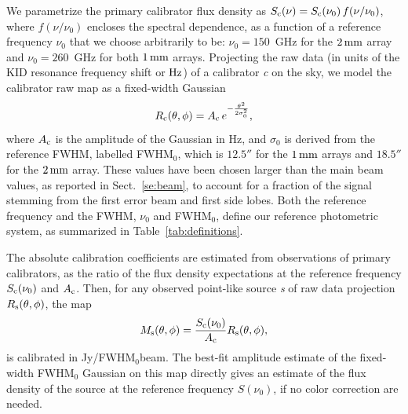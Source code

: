 We parametrize the primary calibrator flux density as 
$S_{\rm{c}}(\nu) = S_{\rm{c}}(\nu_0)\, f(\nu/\nu_{0})$, where $f(\nu/\nu_{0})$
encloses the spectral dependence, 
as a function of a reference frequency $\nu_{0}$ that we choose
arbitrarily to be: $\nu_{0} = 150$~GHz for the $2\,\rm{mm}$ array and
$\nu_{0}= 260$~GHz for both $1\,\rm{mm}$ arrays. Projecting the raw
data (in units of the KID resonance frequency shift or $\rm Hz$) of a
calibrator {\sl c} on the sky, we model the calibrator raw map as a
fixed-width Gaussian
\begin{equation}
  R_{\rm{c}}(\theta, \phi)  = A_{\rm{c}} \, e^{-\frac{\theta^{2}}{2\sigma_{0}^{2}}},
  \label{eq:gaussian_amplitude}
\end{equation}
{\lp where $A_{\rm{c}}$ is the amplitude of the 
Gaussian in Hz,} and $\sigma_{0}$ is derived from the
reference FWHM, labelled FWHM$_{0}$, which is $12.5''$ for the $1\, \rm{mm}$
arrays and $18.5''$ for the $2\,\rm{mm}$ array. These values have
been chosen larger than the main beam values, as reported in
Sect.~\ref{se:beam}, to account for a fraction of the signal stemming from
the first error beam and first side lobes.
Both the reference frequency and the FWHM, $\nu_0$ and FWHM$_{0}$, define
our reference photometric system, as summarized in Table~\ref{tab:definitions}.

The absolute calibration coefficients are estimated from observations
of primary calibrators, as the ratio of
the flux density expectations at the reference frequency
$S_{\rm{c}}(\nu_0)$ and $A_{\rm{c}}$. Then, for any observed point-like source
{\sl s} of raw data projection $R_{\rm{s}}(\theta,\phi)$, the map
\begin{equation}
  M_{\rm{s}}(\theta, \phi) = \frac{S_{\rm{c}} (\nu_{0})}{A_{\rm{c}}}
  R_{\rm{s}}(\theta,\phi),
  \label{eq:pointsourcephot}
\end{equation}
is calibrated in Jy/FWHM$_{0}$beam. {\lp The best-fit amplitude estimate
of the fixed-width FWHM$_{0}$ Gaussian on this map directly gives an
estimate of the flux density of the source at the reference
frequency $S(\nu_{0})$, if no color correction are needed.}

